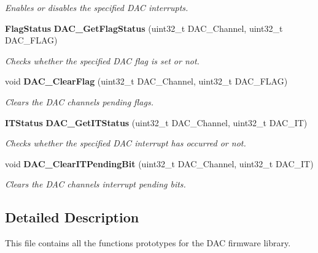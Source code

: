 \begin{DoxyCompactItemize}
\begin{DoxyCompactList}\small\item\em Enables or disables the specified D\+AC interrupts. \end{DoxyCompactList}\item 
\textbf{ Flag\+Status} \textbf{ D\+A\+C\+\_\+\+Get\+Flag\+Status} (uint32\+\_\+t D\+A\+C\+\_\+\+Channel, uint32\+\_\+t D\+A\+C\+\_\+\+F\+L\+AG)
\begin{DoxyCompactList}\small\item\em Checks whether the specified D\+AC flag is set or not. \end{DoxyCompactList}\item 
void \textbf{ D\+A\+C\+\_\+\+Clear\+Flag} (uint32\+\_\+t D\+A\+C\+\_\+\+Channel, uint32\+\_\+t D\+A\+C\+\_\+\+F\+L\+AG)
\begin{DoxyCompactList}\small\item\em Clears the D\+AC channel\textquotesingle{}s pending flags. \end{DoxyCompactList}\item 
\textbf{ I\+T\+Status} \textbf{ D\+A\+C\+\_\+\+Get\+I\+T\+Status} (uint32\+\_\+t D\+A\+C\+\_\+\+Channel, uint32\+\_\+t D\+A\+C\+\_\+\+IT)
\begin{DoxyCompactList}\small\item\em Checks whether the specified D\+AC interrupt has occurred or not. \end{DoxyCompactList}\item 
void \textbf{ D\+A\+C\+\_\+\+Clear\+I\+T\+Pending\+Bit} (uint32\+\_\+t D\+A\+C\+\_\+\+Channel, uint32\+\_\+t D\+A\+C\+\_\+\+IT)
\begin{DoxyCompactList}\small\item\em Clears the D\+AC channel\textquotesingle{}s interrupt pending bits. \end{DoxyCompactList}\end{DoxyCompactItemize}


\subsection{Detailed Description}
This file contains all the functions prototypes for the D\+AC firmware library. 

